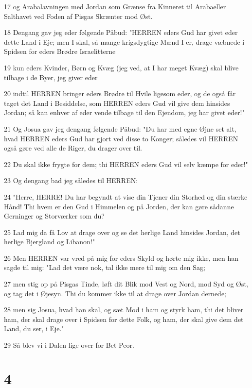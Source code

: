 \par 17 og Arabalavningen med Jordan som Grænse fra Kinneret til Arabaeller Salthavet ved Foden af Pisgas Skrænter mod Øst.
\par 18 Dengang gav jeg eder følgende Påbud: "HERREN eders Gud har givet eder dette Land i Eje; men I skal, så mange krigsdygtige Mænd I er, drage væbnede i Spidsen for eders Brødre Israelitterne
\par 19 kun eders Kvinder, Børn og Kvæg (jeg ved, at I har meget Kvæg) skal blive tilbage i de Byer, jeg giver eder
\par 20 indtil HERREN bringer eders Brødre til Hvile ligesom eder, og de også får taget det Land i Besiddelse, som HERREN eders Gud vil give dem hinsides Jordan; så kan enhver af eder vende tilbage til den Ejendom, jeg har givet eder!"
\par 21 Og Josua gav jeg dengang følgende Påbud: "Du har med egne Øjne set alt, hvad HERREN eders Gud har gjort ved disse to Konger; således vil HERREN også gøre ved alle de Riger, du drager over til.
\par 22 Du skal ikke frygte for dem; thi HERREN eders Gud vil selv kæmpe for eder!"
\par 23 Og dengang bad jeg således til HERREN:
\par 24 "Herre, HERRE! Du har begyndt at vise din Tjener din Storhed og din stærke Hånd! Thi hvem er den Gud i Himmelen og på Jorden, der kan gøre sådanne Gerninger og Storværker som du?
\par 25 Lad mig da få Lov at drage over og se det herlige Land hinsides Jordan, det herlige Bjergland og Libanon!"
\par 26 Men HERREN var vred på mig for eders Skyld og hørte mig ikke, men han sagde til mig: "Lad det være nok, tal ikke mere til mig om den Sag;
\par 27 men stig op på Pisgas Tinde, løft dit Blik mod Vest og Nord, mod Syd og Øst, og tag det i Øjesyn. Thi du kommer ikke til at drage over Jordan dernede;
\par 28 men sig Josua, hvad han skal, og sæt Mod i ham og styrk ham, thi det bliver ham, der skal drage over i Spidsen for dette Folk, og ham, der skal give dem det Land, du ser, i Eje."
\par 29 Så blev vi i Dalen lige over for Bet Peor.

\chapter{4}


